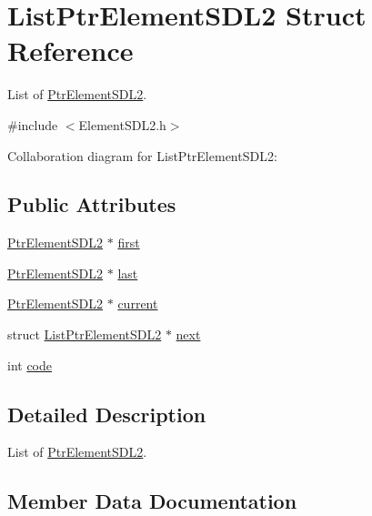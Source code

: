 \hypertarget{structListPtrElementSDL2}{}\section{List\+Ptr\+Element\+S\+D\+L2 Struct Reference}
\label{structListPtrElementSDL2}


List of \hyperlink{structPtrElementSDL2}{Ptr\+Element\+S\+D\+L2}.  




{\ttfamily \#include $<$Element\+S\+D\+L2.\+h$>$}



Collaboration diagram for List\+Ptr\+Element\+S\+D\+L2\+:
\subsection*{Public Attributes}
\begin{DoxyCompactItemize}
\item 
\hyperlink{structPtrElementSDL2}{Ptr\+Element\+S\+D\+L2} $\ast$ \hyperlink{structListPtrElementSDL2_ac6e082dab2ed9516795b21b841a7808f}{first}
\item 
\hyperlink{structPtrElementSDL2}{Ptr\+Element\+S\+D\+L2} $\ast$ \hyperlink{structListPtrElementSDL2_a75a0428e9ce2b7ac513817bb7eb14166}{last}
\item 
\hyperlink{structPtrElementSDL2}{Ptr\+Element\+S\+D\+L2} $\ast$ \hyperlink{structListPtrElementSDL2_aed8b7b9ca4455c05f016dd8089925ba6}{current}
\item 
struct \hyperlink{structListPtrElementSDL2}{List\+Ptr\+Element\+S\+D\+L2} $\ast$ \hyperlink{structListPtrElementSDL2_a43cb2411041a437b88b3bf31c7200756}{next}
\item 
int \hyperlink{structListPtrElementSDL2_aaaf9f2fe9741abeb45133989b00fec00}{code}
\end{DoxyCompactItemize}


\subsection{Detailed Description}
List of \hyperlink{structPtrElementSDL2}{Ptr\+Element\+S\+D\+L2}. 

\subsection{Member Data Documentation}
